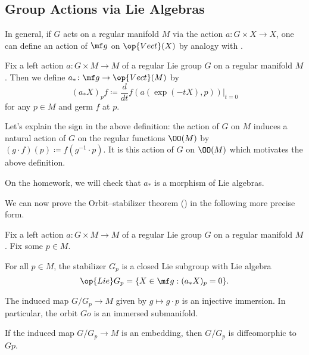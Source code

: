 \documentclass[../notes.tex]{subfiles}
\begin{document}
\subsection{Group Actions via Lie Algebras}
In general, if $G$ acts on a regular manifold $M$ via the action $a\colon G\times X\to X$, one can define an action of $\mf g$ on $\op{Vect}(X)$ by analogy with .
\begin{definition}
	Fix a left action $a\colon G\times M\to M$ of a regular Lie group $G$ on a regular manifold $M$. Then we define $a_*\colon\mf g\to\op{Vect}(M)$ by
	\[(a_*X)_pf\coloneqq\frac d{dt}f(a(\exp(-tX),p))\bigg|_{t=0}\]
	for any $p\in M$ and germ $f$ at $p$.
\end{definition}
\begin{remark}
	Let's explain the sign in the above definition: the action of $G$ on $M$ induces a natural action of $G$ on the regular functions $\OO(M)$ by $(g\cdot f)(p)\coloneqq f\left(g^{-1}\cdot p\right)$. It is this action of $G$ on $\OO(M)$ which motivates the above definition.
\end{remark}
\begin{remark}
	On the homework, we will check that $a_*$ is a morphism of Lie algebras.
\end{remark}
We can now prove the Orbit--stabilizer theorem () in the following more precise form.
\begin{theorem} \label{thm:orbit-stabilizer-lie-algebra}
	Fix a left action $a\colon G\times M\to M$ of a regular Lie group $G$ on a regular manifold $M$. Fix some $p\in M$.
	\begin{listalph}
		\item For all $p\in M$, the stabilizer $G_p$ is a closed Lie subgroup with Lie algebra
		\[\op{Lie}G_p=\{X\in\mf g:(a_*X)_p=0\}.\]
		\item The induced map $G/G_p\to M$ given by $g\mapsto g\cdot p$ is an injective immersion. In particular, the orbit $Go$ is an immersed submanifold.
		\item If the induced map $G/G_p\to M$ is an embedding, then $G/G_p$ is diffeomorphic to $Gp$.
	\end{listalph}
\end{theorem}
\end{document}
